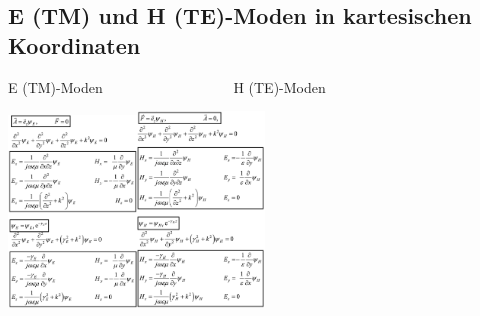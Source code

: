 \documentclass[english]{latex4ei/latex4ei_sheet}
\begin{document}
\begin{sectionbox}
	\subsection{E (TM) und H (TE)-Moden in kartesischen Koordinaten}
	E (TM)-Moden$\quad\quad\quad\quad\quad\quad\quad\quad\quad$ H (TE)-Moden
	\begin{center}\includegraphics[width = 3.4cm]{./img/TM-kartesisch.png}\includegraphics[width = 3.4cm]{./img/TE-kartesisch.png}\end{center}
\end{sectionbox}
 
\end{document}
